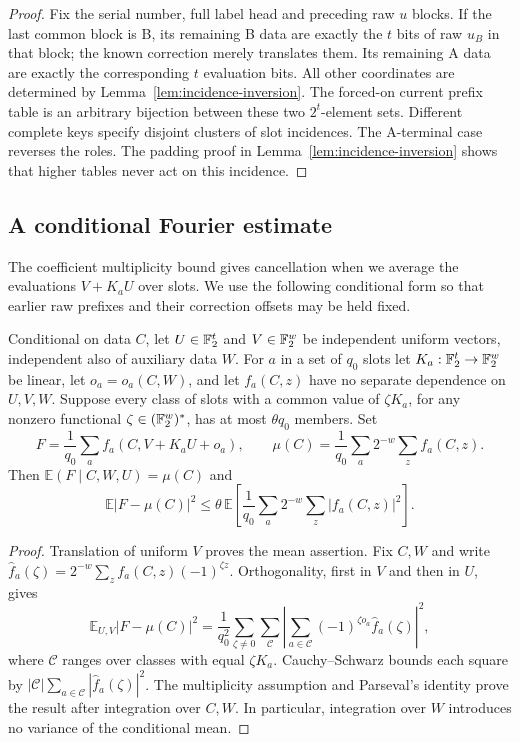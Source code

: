 \begin{proof}
Fix the serial number, full label head and preceding raw $u$ blocks.  If
the last common block is B, its remaining B data are exactly the $t$
bits of raw $u_B$ in that block; the known correction merely translates
them.  Its remaining A data are exactly the corresponding $t$ evaluation
bits.  All other coordinates are determined by
Lemma~\ref{lem:incidence-inversion}.  The forced-on current prefix table
is an arbitrary bijection between these two $2^t$-element sets.
Different complete keys specify disjoint clusters of slot incidences.
The A-terminal case reverses the roles.  The padding proof in
Lemma~\ref{lem:incidence-inversion} shows that higher tables never act on
this incidence.
\end{proof}

\subsection{A conditional Fourier estimate}

The coefficient multiplicity bound gives cancellation when we average
the evaluations $V+K_aU$ over slots.  We use the following conditional
form so that earlier raw prefixes and their correction offsets may be
held fixed.

\begin{lemma}\label{lem:conditional-fourier}
Conditional on data $C$, let $U\in\mathbb F_2^t$ and $V\in\mathbb F_2^w$ be
independent uniform vectors, independent also of auxiliary data $W$.
For $a$ in a set of $q_0$ slots let $K_a:\mathbb F_2^t\to\mathbb F_2^w$ be linear,
let $o_a=o_a(C,W)$, and let $f_a(C,z)$ have no separate dependence on
$U,V,W$.  Suppose every class of slots with a common value of
$\zeta K_a$, for any nonzero functional $\zeta\in(\mathbb F_2^w)^*$,
has at most $\theta q_0$ members.  Set
\[
 F=\frac1{q_0}\sum_a f_a(C,V+K_aU+o_a),\qquad
 \mu(C)=\frac1{q_0}\sum_a2^{-w}\sum_z f_a(C,z).
\]
Then $\mathbb E(F\mid C,W,U)=\mu(C)$ and
\begin{equation}\label{eq:fourier-conditional-bound}
 \mathbb E|F-\mu(C)|^2
 \leq\theta\,\mathbb E\left[\frac1{q_0}\sum_a2^{-w}
                       \sum_z|f_a(C,z)|^2\right].
\end{equation}
\end{lemma}

\begin{proof}
Translation of uniform $V$ proves the mean assertion.  Fix $C,W$ and
write $\widehat f_a(\zeta)=2^{-w}\sum_z f_a(C,z)(-1)^{\zeta z}$.
Orthogonality, first in $V$ and then in $U$, gives
\[
 \mathbb E_{U,V}|F-\mu(C)|^2
 =\frac1{q_0^2}\sum_{\zeta\ne0}\sum_{\mathcal C}
       \left|\sum_{a\in\mathcal C}(-1)^{\zeta o_a}
                          \widehat f_a(\zeta)\right|^2,
\]
where $\mathcal C$ ranges over classes with equal $\zeta K_a$.
Cauchy--Schwarz bounds each square by
$|\mathcal C|\sum_{a\in\mathcal C}|\widehat f_a(\zeta)|^2$.
The multiplicity assumption and Parseval's identity prove the result
after integration over $C,W$.  In particular, integration over $W$
introduces no variance of the conditional mean.
\end{proof}

